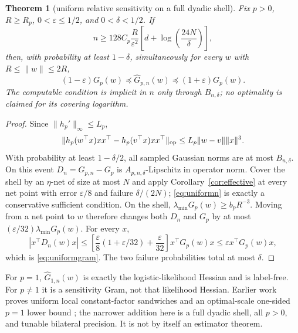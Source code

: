 \documentclass[11pt]{article}
\newtheorem{theorem}{Theorem}[section]
\begin{document}
\begin{theorem}[uniform relative sensitivity on a full dyadic shell]
\label{thm:uniformshell}
Fix $p>0$, $R\ge R_p$, $0<\varepsilon\le1/2$, and $0<\delta<1/2$.  If
\begin{equation}
 n\ge128C_p\frac{R}{\varepsilon^2}
 \left[d+\log\left(\frac{24N}{\delta}\right)\right],
 \label{eq:uniformn}
\end{equation}
then, with probability at least $1-\delta$, simultaneously for every $w$ with
$R\le\lVert w\rVert\le2R$,
\begin{equation}
 (1-\varepsilon)G_p(w)\preceq\widehat G_{p,n}(w)
 \preceq(1+\varepsilon)G_p(w).
 \label{eq:uniformgram}
\end{equation}
The computable condition is implicit in $n$ only through $B_{n,\delta}$; no optimality is claimed for its covering
logarithm.
\end{theorem}

\begin{proof}
Since $\lVert h_p'\rVert_\infty\le L_p$,
\[
 \lVert h_p(w^\top x)xx^\top-h_p(v^\top x)xx^\top\rVert_{\rm op}
 \le L_p\lVert w-v\rVert\lVert x\rVert^3.
\]
With probability at least $1-\delta/2$, all sampled Gaussian norms are at most $B_{n,\delta}$.  On this event
$D_n=\widehat G_{p,n}-G_p$ is $A_{p,n,\delta}$-Lipschitz in operator norm.  Cover the shell by an $\eta$-net of
size at most $N$ and apply Corollary~\ref{cor:effective} at every net point with error $\varepsilon/8$ and failure
$\delta/(2N)$; \eqref{eq:uniformn} is exactly a conservative sufficient condition.  On the shell,
$\lambda_{\min}G_p(w)\ge b_pR^{-3}$.  Moving from a net point to $w$ therefore changes both $D_n$ and $G_p$ by
at most $(\varepsilon/32)\lambda_{\min}G_p(w)$.  For every $x$,
\[
 |x^\top D_n(w)x|
 \le\left[\frac\varepsilon8(1+\varepsilon/32)+\frac\varepsilon{32}\right]x^\top G_p(w)x
 \le\varepsilon x^\top G_p(w)x,
\]
which is \eqref{eq:uniformgram}.  The two failure probabilities total at most $\delta$.
\end{proof}

For $p=1$, $\widehat G_{1,n}(w)$ is exactly the logistic-likelihood Hessian and is label-free.  For $p\ne1$ it is
a sensitivity Gram, not that likelihood Hessian.  Earlier work proves uniform local constant-factor sandwiches and
an optimal-scale one-sided $p=1$ lower bound \cite{ostrovskii2021,chardon2024}; the narrower addition here is a
full dyadic shell, all $p>0$, and tunable bilateral precision.  It is not by itself an estimator theorem.
\end{document}
